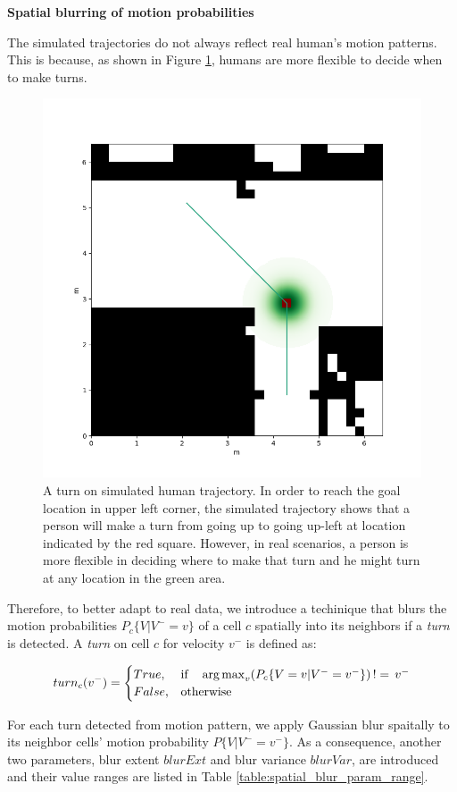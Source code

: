\textbf{Spatial blurring of motion probabilities}

The simulated trajectories do not always reflect real human's motion patterns. This is because, as shown in Figure \ref{fig:blur_idea}, humans are more flexible to decide when to make turns. 

\begin{figure}[ht]
  \centering
   \captionsetup{width=\linewidth}
    \includegraphics[width=.6\textwidth]{figures/blur_idea.png}
    \caption{A turn on simulated human trajectory. In order to reach the goal location in upper left corner, the simulated trajectory shows that a person will make a turn from going up to going up-left at location indicated by the red square. However, in real scenarios, a person is more flexible in deciding where to make that turn and he might turn at any location in the green area.}
    \label{fig:blur_idea}
\end{figure}

Therefore, to better adapt to real data, we introduce a techinique that blurs the motion probabilities  \( P_c\{V | V^-=v\} \) of a cell $c$ spatially into its neighbors if a \textit{turn} is detected. A \textit{turn} on cell $c$ for velocity $v^-$ is defined as:

\[ 
turn_c(v^-) = 
\begin{cases}
    True , & \text{if} \quad \operatorname*{arg\,max}_v (P_c\{V=v | V^-=v^-\}) \, != \, v^- \\
    False,              & \text{otherwise}
\end{cases}
 \]


For each turn detected from motion pattern, we apply Gaussian blur spaitally to its neighbor cells' motion probability $P\{V | V^-=v^-\}$. As a consequence, another two parameters, blur extent \( blurExt \) and blur variance  \( blurVar \), are introduced and their value ranges are listed in Table \ref{table:spatial_blur_param_range}.


